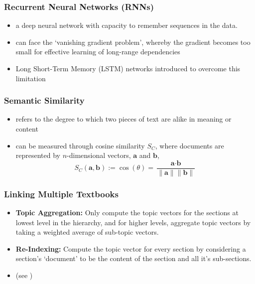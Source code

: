 \documentclass[aspectratio=169]{beamer}
\let\oldparencites\parencites
\renewcommand{\parencites}[1]{{\color{gray}\scriptsize \oldparencites{#1}}}
\let\oldcites\cites
\renewcommand{\cites}[1]{{\color{gray}\scriptsize (see \oldcites{#1})}}
\begin{document}
\begin{frame} \frametitle{Recurrent Neural Networks (RNNs)}

\begin{itemize}
    \item a deep neural network with capacity to remember sequences in the data. \pause
    \item can face the `vanishing gradient problem', whereby the gradient becomes too small for effective learning of long-range dependencies \\ \parencites{bengio1994} \pause
    \item Long Short-Term Memory (LSTM) networks introduced to overcome this limitation \\ \parencites{hochreiter1997}
\end{itemize}

\end{frame}


\begin{frame} \frametitle{Semantic Similarity}

\begin{itemize}
    \item refers to the degree to which two pieces of text are alike in meaning or content \pause
    \item can be measured through cosine similarity $S_C$, where documents are represented by $n$-dimensional vectors, $\textbf{a}$ and $\textbf{b}$,
    \[ S_C(\textbf{a}, \textbf{b}) := \cos(\theta) = \frac{\textbf{a} \cdot \textbf{b}}{\|\textbf{a}\| \|\textbf{b}\|} \]
\end{itemize}

\end{frame}


\begin{frame} \frametitle{Linking Multiple Textbooks}

\begin{itemize}
    \item \textbf{Topic Aggregation:} Only compute the topic vectors for the sections at lowest level in the hierarchy, and for higher levels, aggregate topic vectors by taking a weighted average of sub-topic vectors. \pause
    \item \textbf{Re-Indexing:} Compute the topic vector for every section by considering a section’s ‘document’ to be the content of the section and all it’s sub-sections.
    \item \cites{guerra2013}
\end{itemize}

\end{frame}
\end{document}
